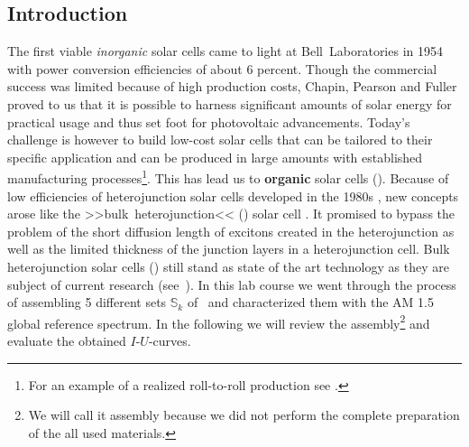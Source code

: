 \documentclass[a4paper,10pt,twocolumn]{article}
\begin{document}
\begin{extract*}
	
\section*{Introduction}%

The first viable \textit{inorganic} solar cells came to light at Bell~Laboratories in 1954 \cite{siliconSC_1}\cite{siliconSC_2} with power conversion efficiencies of about 6 percent. Though the commercial success was limited because of high production costs, Chapin, Pearson and Fuller proved to us that it is possible to harness significant amounts of solar energy for practical usage and thus set foot for photovoltaic advancements.\mypar
Today's challenge is however to build low-cost solar cells that can be tailored to their specific application and can be produced in large amounts with established manufacturing processes\footnote{For an example of a realized roll-to-roll production see \cite{rolltoroll}.}. This has lead us to \textbf{organic} solar cells (\OSC).\mypar
Because of low efficiencies of heterojunction solar cells developed in the 1980s \cite{tang}, new concepts arose like the >>bulk~heterojunction<< (\BHJ) solar cell \cite{heterojunk}. It promised to bypass the problem of the short diffusion length of excitons created in the heterojunction as well as the limited thickness of the junction layers in a heterojunction cell.\mypar
Bulk heterojunction solar cells (\BHSC) still stand as state of the art technology as they are subject of current research (see~\cite{modernbulkhetero}). In this lab course we went through the process of assembling 5 different sets $\mathbb{S}_k$ of \BHSC\ and characterized them with the {\os\sefo AM 1.5} global reference spectrum. In the following we will review the assembly\footnote{We will call it assembly because we did not perform the complete preparation of the all used materials.} and evaluate the obtained $I$-$U$-curves.


\end{extract*}
\end{document}
